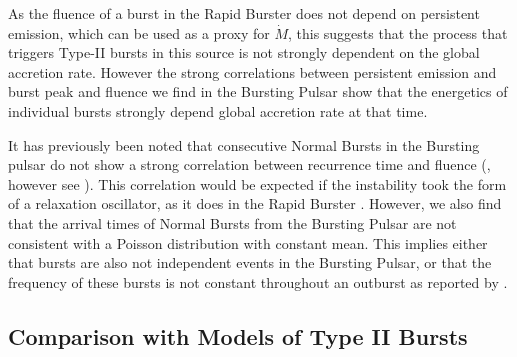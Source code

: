 \par As the fluence of a burst in the Rapid Burster does not depend on persistent emission, which can be used as a proxy for $\dot{M}$, this suggests that the process that triggers Type-II bursts in this source is not strongly dependent on the global accretion rate.  However the strong correlations between persistent emission and burst peak and fluence we find in the Bursting Pulsar show that the energetics of individual bursts strongly depend global accretion rate at that time.
\par It has previously been noted that consecutive Normal Bursts in the Bursting pulsar do not show a strong correlation between recurrence time and fluence (\citealp{Taam_Evo,Lewin_BP}, however see \citealp{Aptekar_OscRel}).  This correlation would be expected if the instability took the form of a relaxation oscillator, as it does in the Rapid Burster \citep{Lewin_TypeII}.  However, we also find that the arrival times of Normal Bursts from the Bursting Pulsar are not consistent with a Poisson distribution with constant mean.  This implies either that bursts are also not independent events in the Bursting Pulsar, or that the frequency of these bursts is not constant throughout an outburst as reported by \citet{Aptekar_Recur}.

\subsection{Comparison with Models of Type II Bursts}

\label{sec:mod}

